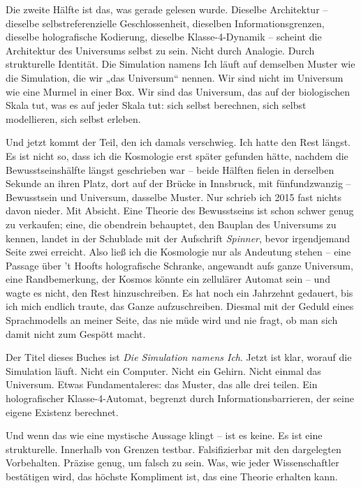 \documentclass[11pt, twoside, openright]{book}
\begin{document}
Die zweite Hälfte ist das, was gerade gelesen wurde. Dieselbe Architektur -- dieselbe selbstreferenzielle Geschlossenheit, dieselben Informationsgrenzen, dieselbe holografische Kodierung, dieselbe Klasse-4-Dynamik -- scheint die Architektur des Universums selbst zu sein. Nicht durch Analogie. Durch strukturelle Identität. Die Simulation namens Ich läuft auf demselben Muster wie die Simulation, die wir „das Universum“ nennen. Wir sind nicht im Universum wie eine Murmel in einer Box. Wir sind das Universum, das auf der biologischen Skala tut, was es auf jeder Skala tut: sich selbst berechnen, sich selbst modellieren, sich selbst erleben.

Und jetzt kommt der Teil, den ich damals verschwieg. Ich hatte den Rest längst. Es ist nicht so, dass ich die Kosmologie erst später gefunden hätte, nachdem die Bewusstseinshälfte längst geschrieben war -- beide Hälften fielen in derselben Sekunde an ihren Platz, dort auf der Brücke in Innsbruck, mit fünfundzwanzig -- Bewusstsein und Universum, dasselbe Muster. Nur schrieb ich 2015 fast nichts davon nieder. Mit Absicht. Eine Theorie des Bewusstseins ist schon schwer genug zu verkaufen; eine, die obendrein behauptet, den Bauplan des Universums zu kennen, landet in der Schublade mit der Aufschrift \textit{Spinner}, bevor irgendjemand Seite zwei erreicht. Also ließ ich die Kosmologie nur als Andeutung stehen -- eine Passage über 't Hoofts holografische Schranke, angewandt aufs ganze Universum, eine Randbemerkung, der Kosmos könnte ein zellulärer Automat sein -- und wagte es nicht, den Rest hinzuschreiben. Es hat noch ein Jahrzehnt gedauert, bis ich mich endlich traute, das Ganze aufzuschreiben. Diesmal mit der Geduld eines Sprachmodells an meiner Seite, das nie müde wird und nie fragt, ob man sich damit nicht zum Gespött macht.

Der Titel dieses Buches ist \textit{Die Simulation namens Ich}. Jetzt ist klar, worauf die Simulation läuft. Nicht ein Computer. Nicht ein Gehirn. Nicht einmal das Universum. Etwas Fundamentaleres: das Muster, das alle drei teilen. Ein holografischer Klasse-4-Automat, begrenzt durch Informationsbarrieren, der seine eigene Existenz berechnet.

Und wenn das wie eine mystische Aussage klingt -- ist es keine. Es ist eine strukturelle. Innerhalb von Grenzen testbar. Falsifizierbar mit den dargelegten Vorbehalten. Präzise genug, um falsch zu sein. Was, wie jeder Wissenschaftler bestätigen wird, das höchste Kompliment ist, das eine Theorie erhalten kann.
\end{document}
